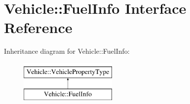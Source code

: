 \hypertarget{interfaceVehicle_1_1FuelInfo}{\section{Vehicle\-:\-:Fuel\-Info Interface Reference}
\label{interfaceVehicle_1_1FuelInfo}
}
Inheritance diagram for Vehicle\-:\-:Fuel\-Info\-:\begin{figure}[H]
\begin{center}
\leavevmode
\includegraphics[height=2.000000cm]{interfaceVehicle_1_1FuelInfo}
\end{center}
\end{figure}
